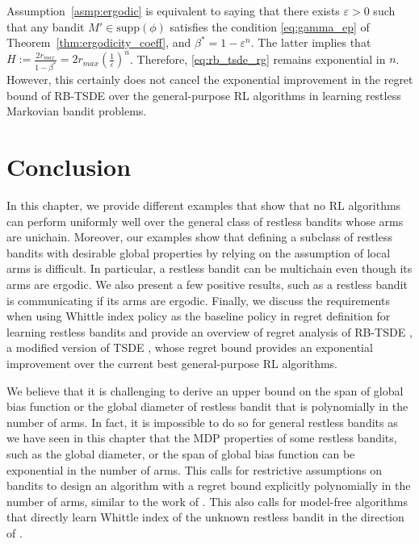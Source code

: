 Assumption~\ref{asmp:ergodic} is equivalent to saying that there exists $\varepsilon>0$ such that any bandit $M'\in\mathrm{supp}(\phi)$ satisfies the condition \eqref{eq:gamma_ep} of Theorem~\ref{thm:ergodicity_coeff}, and $\beta^*=1-\varepsilon^n$.
The latter implies that $H:=\displaystyle\frac{2r_{max}}{1-\beta^*}=\displaystyle2r_{max}\left(\frac{1}{\varepsilon}\right)^n$.
Therefore, \eqref{eq:rb_tsde_rg} remains exponential in $n$.
However, this certainly does not cancel the exponential improvement in the regret bound of RB-TSDE \cite{akbarzadeh2022learning} over the general-purpose RL algorithms in learning restless Markovian bandit problems.

\section{Conclusion}
\label{ch:restless:sec:conclude}

In this chapter, we provide different examples that show that no RL algorithms can perform uniformly well over the general class of restless bandits whose arms are unichain. Moreover, our examples show that defining a subclass of restless bandits with desirable global properties by relying on the assumption of local arms is difficult.
In particular, a restless bandit can be multichain even though its arms are ergodic.
We also present a few positive results, such as a restless bandit is communicating if its arms are ergodic.
Finally, we discuss the requirements when using Whittle index policy as the baseline policy in regret definition for learning restless bandits and provide an overview of regret analysis of RB-TSDE \cite{akbarzadeh2022learning}, a modified version of TSDE \cite{ouyang2017learning}, whose regret bound provides an exponential improvement over the current best general-purpose RL algorithms.

We believe that it is challenging to derive an upper bound on the span of global bias function or the global diameter of restless bandit that is polynomially in the number of arms.
In fact, it is impossible to do so for general restless bandits as we have seen in this chapter that the MDP properties of some restless bandits, such as the global diameter, or the span of global bias function can be exponential in the number of arms.
This calls for restrictive assumptions on bandits to design an algorithm with a regret bound explicitly polynomially in the number of arms, similar to the work of \cite{wang2020restless}.
This also calls for model-free algorithms that directly learn Whittle index of the unknown restless bandit in the direction of \cite{fu2019towards, gibson2021novel, nakhleh2021neurwin, avrachenkov2022whittle}.

